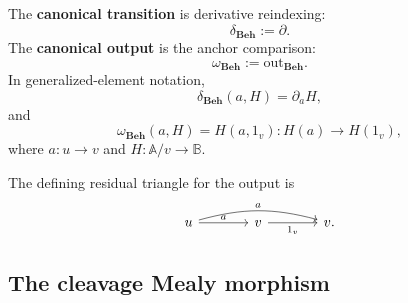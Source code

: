 \begin{definition}
\label{def:canonical-transition-output}
    The \textbf{canonical transition} is derivative reindexing:
    \[
        \delta_{\mathbf{Beh}}:=\partial.
    \]
    The \textbf{canonical output} is the anchor comparison:
    \[
        \omega_{\mathbf{Beh}}:=\mathrm{out}_{\mathbf{Beh}}.
    \]
    In generalized-element notation,
    \[
        \delta_{\mathbf{Beh}}(a,H)=\partial_aH,
    \]
    and
    \[
        \omega_{\mathbf{Beh}}(a,H)=H(a,1_v):H(a)\to H(1_v),
    \]
    where \(a:u\to v\) and \(H:\mathbb A/v\to\mathbb B\).
\end{definition}

The defining residual triangle for the output is
\[
    \begin{tikzcd}[column sep=large, row sep=large]
            u
                \arrow[r, "a"]
                \arrow[rr, "a", bend left=15]
        &
            v
                \arrow[r, "1_v"']
        &
            v.
    \end{tikzcd}
\]

\subsection{The cleavage Mealy morphism}
\label{subsec:cleavage-mealy-morphism}

